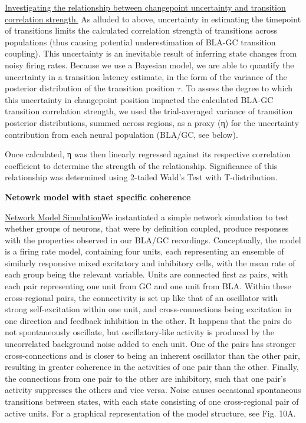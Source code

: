 \begin{refsection}
\noindent\underline{Investigating the relationship between changepoint uncertainty and transition correlation strength.} As alluded to above, uncertainty in estimating the timepoint of transitions limits the calculated correlation strength of transitions across populations (thus causing potential underestimation of BLA-GC transition coupling). This uncertainty is an inevitable result of inferring state changes from noisy firing rates. Because we use a Bayesian model, we are able to quantify the uncertainty in a transition latency estimate, in the form of the variance of the posterior distribution of the transition position \(\tau\). To assess the degree to which this uncertainty in changepoint position impacted the calculated BLA-GC transition correlation strength, we used the trial-averaged variance of transition posterior distributions, summed across regions, as a proxy (η) for the uncertainty contribution from each neural population (BLA/GC, see below).
 
\noindent Once calculated, η was then linearly regressed against its respective correlation coefficient to determine the strength of the relationship. Significance of this relationship was determined using 2-tailed Wald’s Test with T-distribution.

\smallskip
\noindent\textbf{Netowrk model with staet specific coherence}\par
\noindent\underline{Network Model Simulation}We instantiated a simple network simulation to test whether groups of neurons, that were by definition coupled, produce responses with the properties observed in our BLA/GC recordings. Conceptually, the model is a firing rate model, containing four units, each representing an ensemble of similarly responsive mixed excitatory and inhibitory cells, with the mean rate of each group being the relevant variable. Units are connected first as pairs, with each pair representing one unit from GC and one unit from BLA. Within these cross-regional pairs, the connectivity is set up like that of an oscillator with strong self-excitation within one unit, and cross-connections being excitation in one direction and feedback inhibition in the other. It happens that the pairs do not spontaneously oscillate, but oscillatory-like activity is produced by the uncorrelated background noise added to each unit. One of the pairs has stronger cross-connections and is closer to being an inherent oscillator than the other pair, resulting in greater coherence in the activities of one pair than the other. Finally, the connections from one pair to the other are inhibitory, such that one pair’s activity suppresses the others and vice versa. Noise causes occasional spontaneous transitions between states, with each state consisting of one cross-regional pair of active units.  For a graphical representation of the model structure, see Fig. 10A.


\end{refsection}
